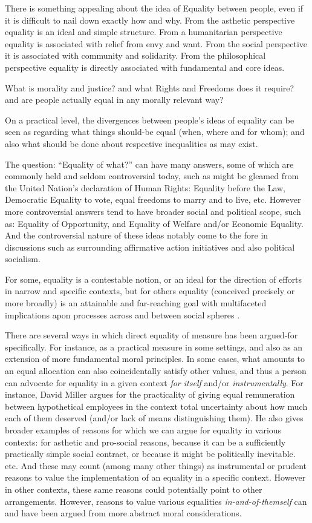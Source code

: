 There is something appealing about the idea of Equality between people, even if it is difficult to nail down exactly how and why.
From the asthetic perspective equality is an ideal and simple structure. From a humanitarian perspective equality is associated with relief from envy and want. From the social perspective it is associated with community and solidarity. From the philosophical perspective equality is directly associated with fundamental and core ideas.

What is morality and justice? and what Rights and Freedoms does it require? and are people actually equal in any morally relevant way?

On a practical level, the divergences between people's ideas of equality can be seen as regarding what things should-be equal (when, where and for whom); and also what should be done about respective inequalities as may exist.

The question: ``Equality of what?'' can have many answers, some of which are commonly held and seldom controversial today, such as might be gleamed from the United Nation's declaration of Human Rights: Equality before the Law, Democratic Equality to vote, equal freedoms to marry and to live, etc.\cite{udhr}
However more controversial answers tend to have broader social and political scope, such as: Equality of Opportunity, and Equality of Welfare and/or Economic Equality. And the controversial nature of these ideas notably come to the fore in discussions such as surrounding affirmative action initiatives and also political socialism.

For some, equality is a contestable notion, or an ideal for the direction of efforts in narrow and specific contexts, but for others equality (conceived precisely or more broadly) is an attainable and far-reaching goal with multifaceted implications apon processes across and between social spheres \cite{walzer2008spheres,millerandwalzer,baker1992arguing}.

There are several ways in which direct equality of measure has been argued-for specifically.
For instance, as a practical measure in some settings, and also as an extension of more fundamental moral principles.
In some cases, what amounts to an equal allocation can also coincidentally satisfy other values, and thus a person can advocate for equality in a given context \textit{for itself} and/or \textit{instrumentally}.
For instance, David Miller \cite{equalityandjustice:1998} argues for the practicality of giving equal remuneration between hypothetical employees in the context total uncertainty about how much each of them deserved (and/or lack of means distinguishing them). He also gives broader examples of reasons for which we can argue for equality in various contexts: for asthetic and pro-social reasons, because it can be a sufficiently practically simple social contract, or because it might be politically inevitable. etc.
And these may count (among many other things) as instrumental or prudent reasons to value the implementation of an equality in a specific context. However in other contexts, these same reasons could potentially point to other arrangements.
However, reasons to value various equalities \textit{in-and-of-themself} can and have been argued from more abstract moral considerations.

